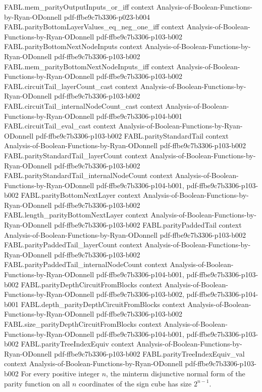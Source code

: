 \begin{theorem}
\proofstep
  {FABL.mem_parityOutputInputs_or_iff}
  {context}
  {Analysis-of-Boolean-Functions-by-Ryan-ODonnell}
  {pdf-ffbe9c7b3306-p023-b004}
\proofstep
  {FABL.parityBottomLayerValues_eq_neg_one_iff}
  {context}
  {Analysis-of-Boolean-Functions-by-Ryan-ODonnell}
  {pdf-ffbe9c7b3306-p103-b002}
\proofstep
  {FABL.parityBottomNextNodeInputs}
  {context}
  {Analysis-of-Boolean-Functions-by-Ryan-ODonnell}
  {pdf-ffbe9c7b3306-p103-b002}
\proofstep
  {FABL.mem_parityBottomNextNodeInputs_iff}
  {context}
  {Analysis-of-Boolean-Functions-by-Ryan-ODonnell}
  {pdf-ffbe9c7b3306-p103-b002}
\proofstep
  {FABL.circuitTail_layerCount_cast}
  {context}
  {Analysis-of-Boolean-Functions-by-Ryan-ODonnell}
  {pdf-ffbe9c7b3306-p103-b002}
\proofstep
  {FABL.circuitTail_internalNodeCount_cast}
  {context}
  {Analysis-of-Boolean-Functions-by-Ryan-ODonnell}
  {pdf-ffbe9c7b3306-p104-b001}
\proofstep
  {FABL.circuitTail_eval_cast}
  {context}
  {Analysis-of-Boolean-Functions-by-Ryan-ODonnell}
  {pdf-ffbe9c7b3306-p103-b002}
\proofstep
  {FABL.parityStandardTail}
  {context}
  {Analysis-of-Boolean-Functions-by-Ryan-ODonnell}
  {pdf-ffbe9c7b3306-p103-b002}
\proofstep
  {FABL.parityStandardTail_layerCount}
  {context}
  {Analysis-of-Boolean-Functions-by-Ryan-ODonnell}
  {pdf-ffbe9c7b3306-p103-b002}
\proofstep
  {FABL.parityStandardTail_internalNodeCount}
  {context}
  {Analysis-of-Boolean-Functions-by-Ryan-ODonnell}
  {pdf-ffbe9c7b3306-p104-b001,
    pdf-ffbe9c7b3306-p103-b002}
\proofstep
  {FABL.parityBottomNextLayer}
  {context}
  {Analysis-of-Boolean-Functions-by-Ryan-ODonnell}
  {pdf-ffbe9c7b3306-p103-b002}
\proofstep
  {FABL.length_parityBottomNextLayer}
  {context}
  {Analysis-of-Boolean-Functions-by-Ryan-ODonnell}
  {pdf-ffbe9c7b3306-p103-b002}
\proofstep
  {FABL.parityPaddedTail}
  {context}
  {Analysis-of-Boolean-Functions-by-Ryan-ODonnell}
  {pdf-ffbe9c7b3306-p103-b002}
\proofstep
  {FABL.parityPaddedTail_layerCount}
  {context}
  {Analysis-of-Boolean-Functions-by-Ryan-ODonnell}
  {pdf-ffbe9c7b3306-p103-b002}
\proofstep
  {FABL.parityPaddedTail_internalNodeCount}
  {context}
  {Analysis-of-Boolean-Functions-by-Ryan-ODonnell}
  {pdf-ffbe9c7b3306-p104-b001,
    pdf-ffbe9c7b3306-p103-b002}
\proofstep
  {FABL.parityDepthCircuitFromBlocks}
  {context}
  {Analysis-of-Boolean-Functions-by-Ryan-ODonnell}
  {pdf-ffbe9c7b3306-p103-b002,
    pdf-ffbe9c7b3306-p104-b001}
\proofstep
  {FABL.depth_parityDepthCircuitFromBlocks}
  {context}
  {Analysis-of-Boolean-Functions-by-Ryan-ODonnell}
  {pdf-ffbe9c7b3306-p103-b002}
\proofstep
  {FABL.size_parityDepthCircuitFromBlocks}
  {context}
  {Analysis-of-Boolean-Functions-by-Ryan-ODonnell}
  {pdf-ffbe9c7b3306-p104-b001,
    pdf-ffbe9c7b3306-p103-b002}
\proofstep
  {FABL.parityTreeIndexEquiv}
  {context}
  {Analysis-of-Boolean-Functions-by-Ryan-ODonnell}
  {pdf-ffbe9c7b3306-p103-b002}
\proofstep
  {FABL.parityTreeIndexEquiv_val}
  {context}
  {Analysis-of-Boolean-Functions-by-Ryan-ODonnell}
  {pdf-ffbe9c7b3306-p103-b002}
For every positive integer $n$, the minterm disjunctive normal form of the parity
function on all $n$ coordinates of the sign cube has size $2^{n-1}$.
\end{theorem}

